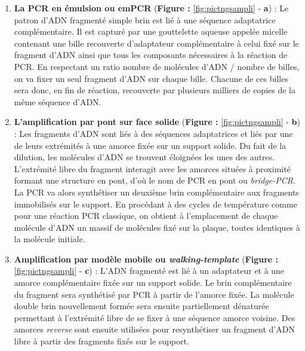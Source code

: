 \documentclass[12pt,a4paper,twoside]{ugathesis}
\theoremstyle{definition}
\theoremstyle{definition}
\theoremstyle{definition}
\theoremstyle{remark}
\begin{document}
\begin{enumerate}
\def\labelenumi{\arabic{enumi}.}
\item
  \textbf{La PCR en émulsion ou emPCR} (\textbf{Figure :
  }\ref{fig:pictngsampli} - \textbf{a}) : Le patron d'ADN fragmenté
  simple brin est lié à une séquence adaptatrice complémentaire. Il est
  capturé par une gouttelette aqueuse appelée micelle contenant une
  bille recouverte d'adaptateur complémentaire à celui fixé sur le
  fragment d'ADN ainsi que tous les composants nécessaires à la réaction
  de PCR. En respectant un ratio nombre de molécules d'ADN / nombre de
  billes, on va fixer un seul fragment d'ADN sur chaque bille. Chacune
  de ces billes sera donc, en fin de réaction, recouverte par plusieurs
  milliers de copies de la même séquence d'ADN.
\item
  \textbf{L'amplification par pont sur face solide} (\textbf{Figure :
  }\ref{fig:pictngsampli} - \textbf{b}) : Les fragments d'ADN sont liés
  à des séquences adaptatrices et liés par une de leurs extrémités à une
  amorce fixée sur un support solide. Du fait de la dilution, les
  molécules d'ADN se trouvent éloignées les unes des autres. L'extrémité
  libre du fragment interagit avec les amorces situées à proximité
  formant une structure en pont, d'où le nom de PCR en pont ou
  \emph{bridge-PCR}. La PCR va alors synthétiser un deuxième brin
  complémentaire aux fragments immobilisés sur le support. En procédant
  à des cycles de température comme pour une réaction PCR classique, on
  obtient à l'emplacement de chaque molécule d'ADN un massif de
  molécules fixé sur la plaque, toutes identiques à la molécule
  initiale.
\item
  \textbf{Amplification par modèle mobile ou \emph{walking-template}
  }(\textbf{Figure : }\ref{fig:pictngsampli} - \textbf{c}) : L'ADN
  fragmenté est lié à un adaptateur et à une amorce complémentaire fixée
  sur un support solide. Le brin complémentaire du fragment sera
  synthétisé par PCR à partir de l'amorce fixée. La molécule double brin
  nouvellement formée sera ensuite partiellement dénaturée permettant à
  l'extrémité libre de se fixer à une séquence amorce voisine. Des
  amorces \emph{reverse} sont ensuite utilisées pour resynthétiser un
  fragment d'ADN libre à partir des fragments fixés sur le support.
\end{enumerate}

\newpage 
\end{document}
